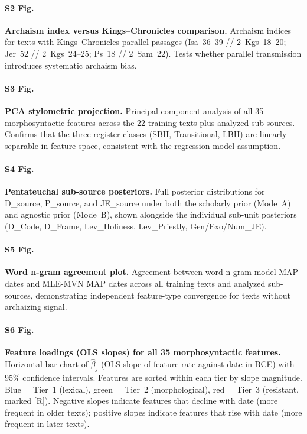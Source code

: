 \documentclass[10pt,letterpaper]{article}
\begin{document}
\paragraph*{S2 Fig.}
\label{S2_Fig}
\textbf{Archaism index versus Kings--Chronicles comparison.}
Archaism indices for texts with Kings--Chronicles parallel passages
(Isa~36--39 // 2~Kgs~18--20; Jer~52 // 2~Kgs~24--25; Ps~18 // 2~Sam~22).
Tests whether parallel transmission introduces systematic archaism bias.

\paragraph*{S3 Fig.}
\label{S3_Fig}
\textbf{PCA stylometric projection.}
Principal component analysis of all 35 morphosyntactic features across
the 22 training texts plus analyzed sub-sources.  Confirms that the
three register classes (SBH, Transitional, LBH) are linearly separable
in feature space, consistent with the regression model assumption.

\paragraph*{S4 Fig.}
\label{S4_Fig}
\textbf{Pentateuchal sub-source posteriors.}
Full posterior distributions for D\_source, P\_source, and JE\_source
under both the scholarly prior (Mode~A) and agnostic prior (Mode~B),
shown alongside the individual sub-unit posteriors (D\_Code, D\_Frame,
Lev\_Holiness, Lev\_Priestly, Gen/Exo/Num\_JE).

\paragraph*{S5 Fig.}
\label{S5_Fig}
\textbf{Word n-gram agreement plot.}
Agreement between word n-gram model MAP dates and MLE-MVN MAP dates
across all training texts and analyzed sub-sources, demonstrating
independent feature-type convergence for texts without archaizing signal.

\paragraph*{S6 Fig.}
\label{S6_Fig}
\textbf{Feature loadings (OLS slopes) for all 35 morphosyntactic features.}
Horizontal bar chart of $\hat{\beta}_j$ (OLS slope of feature rate against
date in BCE) with 95\% confidence intervals.  Features are sorted within
each tier by slope magnitude.  Blue = Tier~1 (lexical), green = Tier~2
(morphological), red = Tier~3 (resistant, marked [R]).  Negative slopes
indicate features that decline with date (more frequent in older texts);
positive slopes indicate features that rise with date (more frequent in
later texts).
\end{document}
